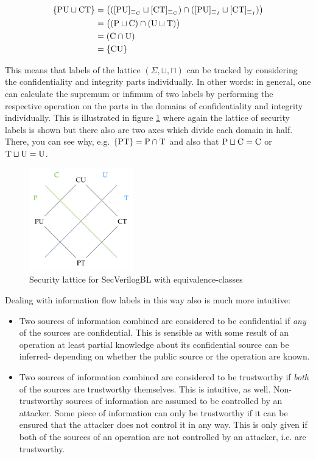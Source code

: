\begin{example}
    \begin{align*}
        \{ \text{PU} \sqcup \text{CT} \} &= \big(([\text{PU}]_{\equiv_C} \sqcup [\text{CT}]_{\equiv_C}) \cap ([\text{PU}]_{\equiv_I} \sqcup [\text{CT}]_{\equiv_I}) \big) \\
        &= \big((\text{P} \sqcup \text{C}) \cap (\text{U} \sqcup \text{T}) \big) \\
        &= (\text{C} \cap \text{U}) \\
        &= \{ \text{CU} \}
    \end{align*}
\end{example}

This means that labels of the lattice $ (\Sigma, \sqcup, \sqcap) $ can be tracked by considering the confidentiality and integrity parts individually.
In other words: in general, one can calculate the supremum or infimum of two labels by performing the respective operation on the parts in the domains of confidentiality and integrity individually.
This is illustrated in figure \ref{fig:lattice-equiv-classes} where again the lattice of security labels is shown but there also are two axes which divide each domain in half.
There, you can see why, e.g. $ \{ \text{PT} \} = \text{P} \cap \text{T} $ and also that $ \text{P} \sqcup \text{C} = \text{C} $ or $ \text{T} \sqcup \text{U} = \text{U} $.

\begin{figure}
    \centering
    \includegraphics[width=0.4\textwidth]{figures/equivalence-class-lattice.png}
    \caption{Security lattice for SecVerilogBL \cite{Ferraiuolo17} with equivalence-classes}
    \label{fig:lattice-equiv-classes}
\end{figure}

Dealing with information flow labels in this way also is much more intuitive:
\begin{itemize}
    \item Two sources of information combined are considered to be confidential if \textit{any} of the sources are confidential.
    This is sensible as with some result of an operation at least partial knowledge about its confidential source can be inferred- depending on whether the public source or the operation are known.
    \item Two sources of information combined are considered to be trustworthy if \textit{both} of the sources are trustworthy themselves.
    This is intuitive, as well.
    Non-trustworthy sources of information are assumed to be controlled by an attacker.
    Some piece of information can only be trustworthy if it can be ensured that the attacker does not control it in any way.
    This is only given if both of the sources of an operation are not controlled by an attacker, i.e. are trustworthy.
\end{itemize}

